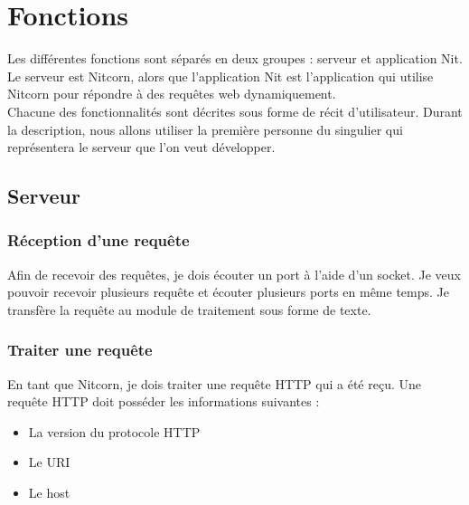 \documentclass{scrreprt}
\begin{document}
\section{Fonctions}
Les différentes fonctions sont séparés en deux groupes : serveur et application Nit.
Le serveur est Nitcorn, alors que l'application Nit est l'application qui utilise
Nitcorn pour répondre à des requêtes web dynamiquement. \\
Chacune des fonctionnalités sont décrites sous forme de récit d'utilisateur. Durant la description, nous allons utiliser la première personne du singulier qui représentera le serveur que l'on veut développer.

\subsection{Serveur}
\subsubsection{Réception d'une requête}
Afin de recevoir des requêtes, je dois écouter un port à l'aide d'un socket. Je
veux pouvoir recevoir plusieurs requête et écouter plusieurs ports en même
temps. Je transfère la requête au module de traitement sous forme de texte.

\subsubsection{Traiter une requête}
En tant que Nitcorn, je dois traiter une requête HTTP qui a été reçu. Une requête
HTTP doit posséder les informations suivantes :
\begin{itemize}
    \item La version du protocole HTTP
    \item Le URI
    \item Le host
\end{itemize}
\end{document}
